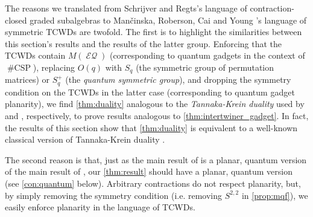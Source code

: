 \documentclass{article}
\DeclareMathOperator{\csp}{\#CSP}
\DeclareMathOperator{\eq}{\mathcal{EQ}}
\begin{document}
\begin{remark}
    \label{rem:duality}
    The reasons we translated from 
    Schrijver and Regts's \cite{schrijver_tensor_2008, regts_rank_2012} language of
    contraction-closed graded subalgebras to
    Man\v{c}inska, Roberson, Cai and Young
    \cite{planar, cai_planar_2023, young2022equality}'s language of symmetric TCWDs are twofold. 
    The first is to highlight the similarities
    between this section's results and the results of the latter group. 
    Enforcing that
    the TCWDs contain $M(\eq)$ (corresponding to quantum gadgets in the context of $\csp$), 
    replacing $O(q)$ with $S_q$ (the symmetric group of permutation matrices) or $S^+_q$ 
    (the \emph{quantum symmetric group}), 
    and dropping the symmetry condition on the TCWDs 
    in the latter case (corresponding to quantum gadget planarity), we find 
    \autoref{thm:duality} analogous to the
    \emph{Tannaka-Krein duality} used by \cite{young2022equality} and 
    \cite{planar, cai_planar_2023}, respectively, to prove results analogous to 
    \autoref{thm:intertwiner_gadget}. In fact, the results of this section show that
    \autoref{thm:duality} is equivalent to a well-known classical version of Tannaka-Krein
    duality \cite[Theorem 1.3]{banica_liberation_2009}.

    The second reason is that, just as the main result of \cite{cai_planar_2023} is a planar, quantum
    version
    of the main result of \cite{young2022equality}, our \autoref{thm:result} should have a planar, 
    quantum
    version (see \autoref{con:quantum} below). Arbitrary contractions do not respect planarity, but,
    by simply removing the symmetry condition (i.e. removing $S^{2,2}$ in \autoref{prop:mqf}), 
    we easily enforce planarity in the language of TCWDs.
\end{remark}
\end{document}
